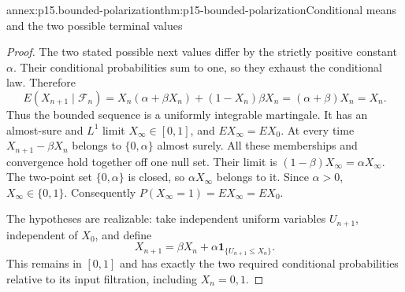 \begin{annexitem}{annex:p15.bounded-polarization}{thm:p15-bounded-polarization}{Conditional means and the two possible terminal values}
\begin{proof}
The two stated possible next values differ by the strictly positive
constant \(\alpha\). Their conditional probabilities sum to one,
so they exhaust the conditional law. Therefore
\[
 E(X_{n+1}\mid\mathcal F_n)
      =X_n(\alpha+\beta X_n)+(1-X_n)\beta X_n
      =(\alpha+\beta)X_n=X_n.
\]
Thus the bounded sequence is a uniformly integrable martingale.
It has an almost-sure and \(L^1\) limit \(X_\infty\in[0,1]\),
and \(EX_\infty=EX_0\).
At every time \(X_{n+1}-\beta X_n\) belongs to \(\{0,\alpha\}\)
almost surely. All these memberships and convergence hold together
off one null set. Their limit is
\((1-\beta)X_\infty=\alpha X_\infty\).
The two-point set \(\{0,\alpha\}\) is closed, so
\(\alpha X_\infty\) belongs to it. Since \(\alpha>0\),
\(X_\infty\in\{0,1\}\).
Consequently \(P(X_\infty=1)=EX_\infty=EX_0\).

The hypotheses are realizable: take independent uniform variables
\(U_{n+1}\), independent of \(X_0\), and define
\[
           X_{n+1}=\beta X_n+\alpha\mathbf1_{\{U_{n+1}\leq X_n\}}.
\]
This remains in \([0,1]\) and has exactly the two required conditional
probabilities relative to its input filtration, including \(X_n=0,1\).
\end{proof}
\end{annexitem}

